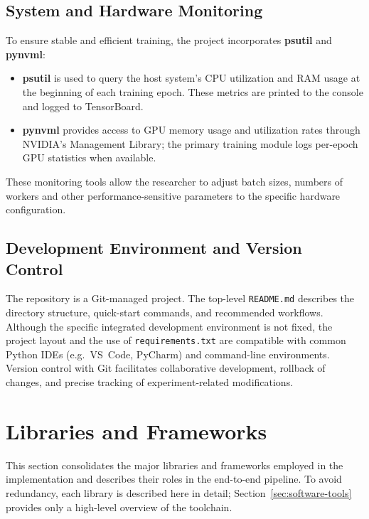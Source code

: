 \subsection{System and Hardware Monitoring}

To ensure stable and efficient training, the project incorporates \textbf{psutil} and \textbf{pynvml}:
\begin{itemize}
  \item \textbf{psutil} is used to query the host system's CPU utilization and RAM usage at the beginning of each training epoch. These metrics are printed to the console and logged to TensorBoard.
  \item \textbf{pynvml} provides access to GPU memory usage and utilization rates through NVIDIA's Management Library; the primary training module logs per-epoch GPU statistics when available.
\end{itemize}

These monitoring tools allow the researcher to adjust batch sizes, numbers of workers and other performance-sensitive parameters to the specific hardware configuration.

\subsection{Development Environment and Version Control}

The repository is a Git-managed project. The top-level \texttt{README.md} describes the directory structure, quick-start commands, and recommended workflows. Although the specific integrated development environment is not fixed, the project layout and the use of \texttt{requirements.txt} are compatible with common Python IDEs (e.g.\ VS~Code, PyCharm) and command-line environments. Version control with Git facilitates collaborative development, rollback of changes, and precise tracking of experiment-related modifications.

\section{Libraries and Frameworks}
\label{sec:libraries}

This section consolidates the major libraries and frameworks employed in the implementation and describes their roles in the end-to-end pipeline. To avoid redundancy, each library is described here in detail; Section~\ref{sec:software-tools} provides only a high-level overview of the toolchain.

